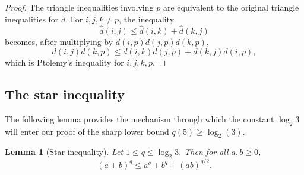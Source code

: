 \documentclass[12pt]{amsart}
\newtheorem{lemma}[theorem]{Lemma}
\theoremstyle{definition}
\newcommand{\1}{\mathbf{1}}
\renewcommand\geq{\geqslant}
\begin{document}
\begin{proof}
The triangle inequalities involving $p$ are equivalent to the original triangle
inequalities for $d$.  For $i,j,k\ne p$, the inequality
\[
        \widehat d(i,j)\le \widehat d(i,k)+\widehat d(k,j)
\]
becomes, after multiplying by $d(i,p)d(j,p)d(k,p)$,
\[
        d(i,j)d(k,p)\le d(i,k)d(j,p)+d(k,j)d(i,p),
\]
which is Ptolemy's inequality for $i,j,k,p$.
\end{proof}

\subsection{The star inequality}

The following lemma provides the mechanism through which the constant $\log_2 3$ will enter our proof of the sharp lower bound $q(5) \geq \log_2(3)$.

\begin{lemma}[Star inequality]
\label{lem:q5-star}
Let $1\le q\le \log_2 3$.  Then for all $a,b\ge0$,
\[
        (a+b)^q\le a^q+b^q+(ab)^{q/2}.
\]
\end{lemma}
\end{document}

